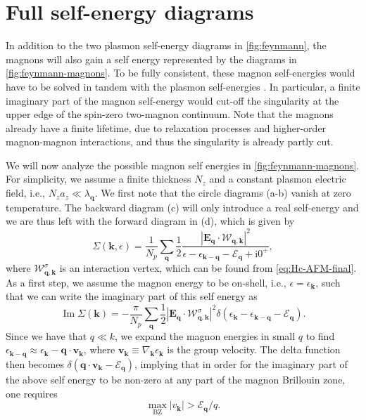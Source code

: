 \documentclass[aps,prb,reprint,twocolumns,superscriptaddress,nofootinbib]{revtex4-2}
\newcommand{\ii}{\mathrm{i}}
\renewcommand{\Im}{\operatorname{Im}}
\begin{document}
	\section{Full self-energy diagrams}
	\label{app:self-energies-magnon}
	In addition to the two plasmon self-energy diagrams in \cref{fig:feynmann}, the magnons will also gain a self energy represented by the diagrams in \cref{fig:feynmann-magnons}. To be fully consistent, these magnon self-energies would have to be solved in tandem with the plasmon self-energies \cite{chernyshevSpinWavesTriangular2009}. In particular, a finite imaginary part of the magnon self-energy would cut-off the singularity at the upper edge of the spin-zero two-magnon continuum. Note that the magnons already have a finite lifetime, due to relaxation processes and higher-order magnon-magnon interactions, and thus the singularity is already partly cut.
	
	We will now analyze the possible magnon self energies in \cref{fig:feynmann-magnons}. For simplicity, we assume a finite thickness $N_z$ and a constant plasmon electric field, i.e., $N_za_z\ll\lambda_{\bm q}$.
	We first note that the circle diagrams (a-b) vanish at zero temperature. The backward diagram (c) will only introduce a real self-energy and we are thus left with the forward diagram in (d), which is given by  
	\begin{equation}
		\Sigma(\bm k, \epsilon) = \frac{1}{N_p}\sum_{\bm q} \frac12 \frac{|\bm E_{\bm q}\cdot\bm{\mathcal W}_{\bm q,\bm k}|^2}{\epsilon - \epsilon_{\bm k - \bm q} - \mathcal E_{\bm q} + \ii 0^+},
	\end{equation}
	where $\bm{\mathcal W}_{\bm q,\bm k}^{\sigma}$ is an interaction vertex, which can be found from \cref{eq:Hc-AFM-final}. As a first step, we assume the magnon energy to be on-shell, i.e., $\epsilon=\epsilon_{\bm k}$, such that we can write the imaginary part of this self energy as
	\begin{equation}
		\Im\Sigma(\bm k) = -\frac{\pi}{N_p}\sum_{\bm q} \frac12 |\bm E_{\bm q}\cdot\bm{\mathcal W}_{\bm q,\bm k}^{\sigma}|^2\delta(\epsilon_{\bm k} - \epsilon_{\bm k - \bm q} - \mathcal E_{\bm q}).
	\end{equation}
	Since we have that $q\ll k$, we expand the magnon energies in small $q$ to find $\epsilon_{\bm k - \bm q}\approx \epsilon_{\bm k} - \bm q\cdot\bm v_{\bm k}$, where $\bm v_{\bm k}\equiv \nabla_{\bm k}\epsilon_{\bm k}$ is the group velocity. The delta function then becomes $		\delta(\bm q\cdot\bm v_{\bm k} - \mathcal E_{\bm q})$, implying that in order for the imaginary part of the above self energy to be non-zero at any part of the magnon Brillouin zone, one requires
	\begin{equation}
		\max_{\mathrm{BZ}}|v_{\bm k}| > \mathcal E_{\bm q} / q.
	\end{equation}
	
\end{document}
